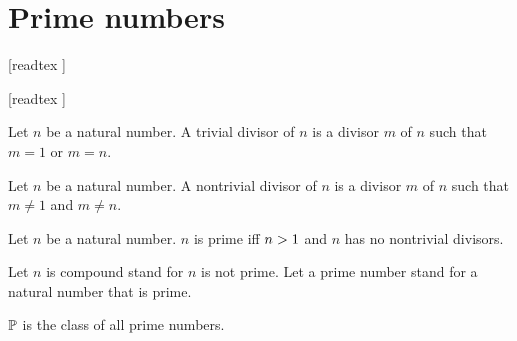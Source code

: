 \documentclass[../arithmetic.tex]{subfiles}
\begin{document}
  \chapter{Prime numbers}\label{chapter:primes}


  \begin{forthel}

    [readtex ]

    [readtex ]

  \end{forthel}


  \begin{forthel}
    \begin{definition}
      Let $n$ be a natural number.
      A trivial divisor of $n$ is a divisor $m$ of $n$ such that $m = 1$ or
      $m = n$.
    \end{definition}
  \end{forthel}

  \begin{forthel}
    \begin{definition}
      Let $n$ be a natural number.
      A nontrivial divisor of $n$ is a divisor $m$ of $n$ such that $m \neq 1$
      and $m \neq n$.
    \end{definition}
  \end{forthel}

  \begin{forthel}
    \begin{definition}
      Let $n$ be a natural number.
      $n$ is prime iff $n > 1$ and $n$ has no nontrivial divisors.
    \end{definition}

    Let $n$ is compound stand for $n$ is not prime.
    Let a prime number stand for a natural number that is prime.
  \end{forthel}

  \begin{forthel}
    \begin{definition}
      $\mathbb{P}$ is the class of all prime numbers.
    \end{definition}
  \end{forthel}
\end{document}
